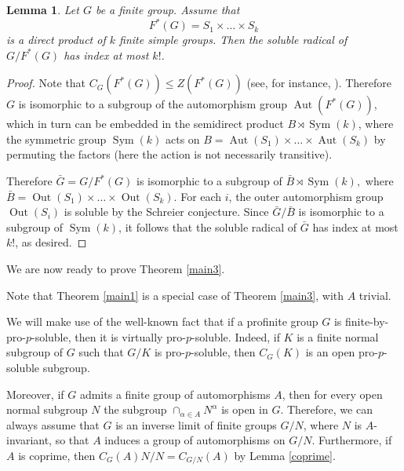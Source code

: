 \documentclass[12pt]{amsart}
\newtheorem{lemma}[theorem]{\bf Lemma}
\newcommand{\al }{\alpha }
\DeclareMathOperator{\aut}{Aut}
\DeclareMathOperator{\out}{Out}
\DeclareMathOperator{\Sym}{Sym}
\begin{document}
\begin{lemma}\label{lambda_total} 
Let $G$ be a finite group. Assume that 
 \[F^{*}(G)=S_1\times\dots\times S_k\]
 is a direct product of $k$ finite simple groups. 
 Then the soluble radical of $G/F^{*}(G)$ has index at most $k!$. 
\end{lemma} 
\begin{proof}  
Note that $C_G(F^*(G)) \le Z(F^*(G))$ (see, for instance, \cite[Theorem 9.8]{Isaacs}). Therefore $G$ is isomorphic to a subgroup of the automorphism group $\aut(F^*(G))$, which in turn can be embedded in the semidirect product $B\rtimes \Sym(k)$, where the symmetric group $\Sym(k)$ acts on $B=\aut(S_1)\times\dots\times\aut(S_k)$ by permuting the factors (here the action is not necessarily transitive). 

Therefore $\bar G=G/F^*(G)$ is isomorphic to a subgroup of $\bar B\rtimes\Sym(k),$ where $\bar B=\out(S_1)\times\dots\times\out(S_k)$. For each $i$, the outer automorphism group $\out(S_i)$ is soluble by the Schreier conjecture. Since $\bar G/\bar B$ is isomorphic to a subgroup of $\Sym(k)$, it follows that  the soluble radical of $\bar G$ has index at most $k!$, as desired. 
\end{proof} 


We are now ready to prove Theorem \ref{main3}.

 Note that Theorem \ref{main1} is a special case of Theorem \ref{main3}, with $A$ trivial.
 
 We will make use of the well-known fact that if a profinite group $G$ is finite-by-pro-$p$-soluble, then it is virtually pro-$p$-soluble. Indeed, if $K$ is a finite normal subgroup of $G$ such that $G/K$ is pro-$p$-soluble, then $C_G(K)$ is an open pro-$p$-soluble subgroup. 
 
Moreover, if $G$ admits a finite group of automorphisms $A$, then for every open normal subgroup $N$ the subgroup 
 $\cap_{\al\in A} N^{\al}$ is open in $G$. Therefore, we can always assume that  $G$ is an inverse limit of finite groups $G/N$, where $N$ is $A$-invariant, so that $A$ induces a group of  automorphisms on $G/N$. 
  Furthermore, if $A$ is coprime,  then $C_G(A)N/N=C_{G/N}(A)$ by Lemma \ref{coprime}. 
 
\end{document}
